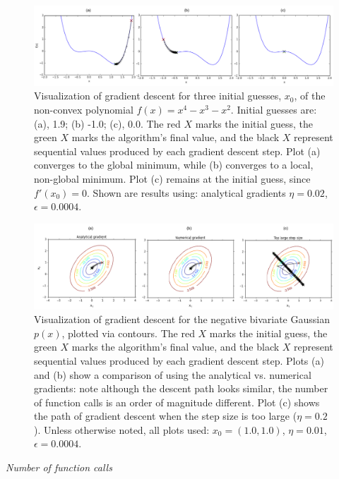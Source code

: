 \documentclass{article}
\begin{document}
\begin{figure}[!ht]
\centering
\includegraphics[scale=0.9]{polynomialdescent.pdf}
\caption{Visualization of gradient descent for three initial guesses, $x_0$, of the non-convex polynomial $f(x) = x^4 - x^3 -x^2$.  Initial guesses are: (a), 1.9; (b) -1.0; (c), 0.0.  The red $X$ marks the initial guess, the green $X$ marks the algorithm's final value, and the black $X$ represent sequential values produced by each gradient descent step. Plot (a) converges to the global minimum, while (b) converges to a local, non-global minimum.  Plot (c) remains at the initial guess, since $f'(x_0)=0$. Shown are results using: analytical gradients $\eta = 0.02$, $\epsilon = 0.0004$.}
\label{grad-descent-iterations}
\end{figure}

\begin{figure}[!ht]
\centering
\includegraphics[scale=0.9]{negGaussianDescent.pdf}
\caption{Visualization of gradient descent for the negative bivariate Gaussian $p(x)$, plotted via contours.  The red $X$ marks the initial guess, the green $X$ marks the algorithm's final value, and the black $X$ represent sequential values produced by each gradient descent step.  Plots (a) and (b) show a comparison of using the analytical vs. numerical gradients: note although the descent path looks similar, the number of function calls is an order of magnitude different.   Plot (c) shows the path of gradient descent when the step size is too large ($\eta = 0.2$). Unless otherwise noted, all plots used: $x_0 = (1.0,1.0)$, $\eta = 0.01$, $\epsilon = 0.0004$.}
\label{grad-descent-iterations}
\end{figure}



\textit{Number of function calls}
\end{document}
